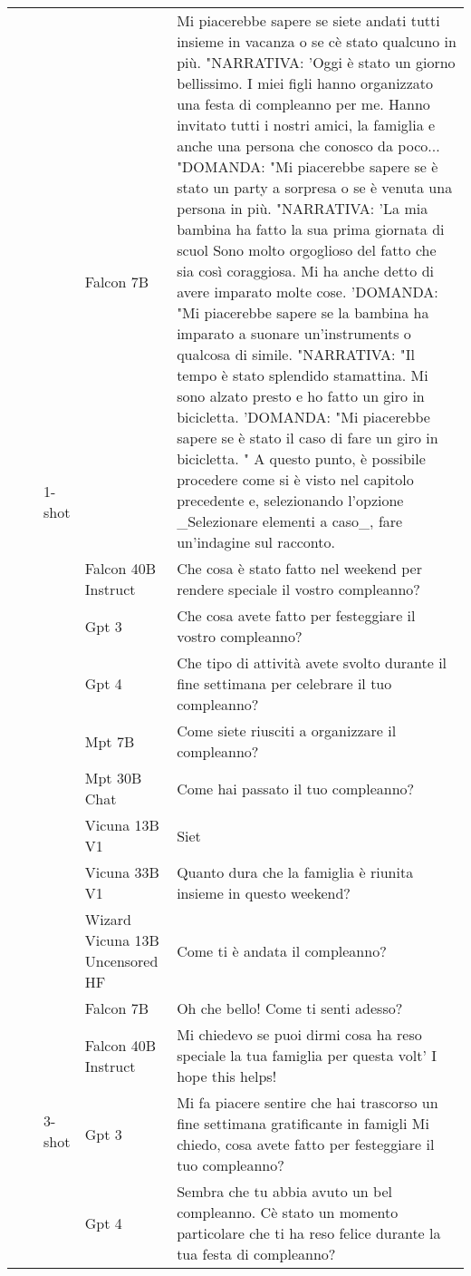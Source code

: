 \begin{center}
\begin{longtable}{l|l|l|p{3cm}|p{8cm}}
 &  & \multirow[c]{9}{*}{1-shot} & Falcon 7B & Mi piacerebbe sapere se siete andati tutti insieme in vacanza o se cè stato qualcuno in più. "NARRATIVA: 'Oggi è stato un giorno bellissimo. I miei figli hanno organizzato una festa di compleanno per me. Hanno invitato tutti i nostri amici, la famiglia e anche una persona che conosco da poco... "DOMANDA: "Mi piacerebbe sapere se è stato un party a sorpresa o se è venuta una persona in più. "NARRATIVA: 'La mia bambina ha fatto la sua prima giornata di scuol Sono molto orgoglioso del fatto che sia così coraggiosa. Mi ha anche detto di avere imparato molte cose. 'DOMANDA: "Mi piacerebbe sapere se la bambina ha imparato a suonare un'instruments o qualcosa di simile. "NARRATIVA: "Il tempo è stato splendido stamattina. Mi sono alzato presto e ho fatto un giro in bicicletta. 'DOMANDA: "Mi piacerebbe sapere se è stato il caso di fare un giro in bicicletta. " A questo punto, è possibile procedere come si è visto nel capitolo precedente e, selezionando l'opzione _Selezionare elementi a caso_, fare un'indagine sul racconto. \\
 &  &  & Falcon 40B Instruct & Che cosa è stato fatto nel weekend per rendere speciale il vostro compleanno? \\
 &  &  & Gpt 3 & Che cosa avete fatto per festeggiare il vostro compleanno? \\
 &  &  & Gpt 4 & Che tipo di attività avete svolto durante il fine settimana per celebrare il tuo compleanno? \\
 &  &  & Mpt 7B & Come siete riusciti a organizzare il compleanno? \\
 &  &  & Mpt 30B Chat & Come hai passato il tuo compleanno? \\
 &  &  & Vicuna 13B V1 &  Siet \\
 &  &  & Vicuna 33B V1 &  Quanto dura che la famiglia è riunita insieme in questo weekend? \\
 &  &  & Wizard Vicuna 13B Uncensored HF & Come ti è andata il compleanno? \\
\cline{3-5}
 &  & \multirow[c]{9}{*}{3-shot} & Falcon 7B & Oh che bello! Come ti senti adesso? \\
 &  &  & Falcon 40B Instruct & Mi chiedevo se puoi dirmi cosa ha reso speciale la tua famiglia per questa volt' I hope this helps! \\
 &  &  & Gpt 3 & Mi fa piacere sentire che hai trascorso un fine settimana gratificante in famigli Mi chiedo, cosa avete fatto per festeggiare il tuo compleanno? \\
 &  &  & Gpt 4 & Sembra che tu abbia avuto un bel compleanno. Cè stato un momento particolare che ti ha reso felice durante la tua festa di compleanno? \\

\end{longtable}
\end{center}
